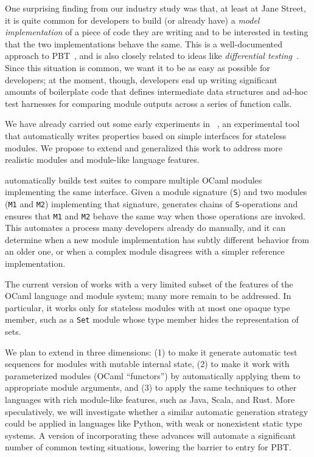 %
One surprising finding from our industry study was that, at least at
Jane Street,
it is quite common for developers to build (or already have) a {\em
model implementation} of a piece of code they are writing and to be
interested in testing that the two
implementations behave the same.  This is a well-documented approach to
PBT~\cite{hughes_experiences_2016}, and is also closely related to ideas like
{\em differential testing}~\cite{mckeeman1998differential}.
%
Since this situation is common, we want it to be as easy as possible
for developers; at the moment, though, developers end up writing
significant amounts of boilerplate code that defines intermediate data
structures and ad-hoc test harnesses for comparing module outputs across a
series of function calls.

We have already carried out some early experiments in
{\Mica}~\cite{Ng2023MicaPoster}, an experimental tool that automatically
writes properties based on simple interfaces for stateless modules.
We propose to extend and generalized this work to address more
realistic modules and module-like language features.


{\Mica} automatically builds test suites to compare multiple OCaml
modules implementing the same interface. Given a module signature
(\lstinline{S}) and two modules
(\lstinline{M1} and \lstinline{M2}) implementing that signature, {\Mica}
generates chains of \lstinline{S}-operations and ensures that
\lstinline{M1} and \lstinline{M2} behave the same way when those operations are
invoked. This automates a process many developers already do manually,
and it can
determine when a new module implementation has subtly different
behavior from an older one, or when a
complex module disagrees with a simpler reference implementation.

The current version of {\Mica} works with a very limited subset of
the features of the OCaml language and
module system; many more remain to be addressed. In particular, it
works only for stateless modules with at most one opaque type
member, such as a {\tt Set} module whose type member hides the
representation of sets.

We plan to extend {\Mica} in three dimensions: (1) to make it generate automatic
test sequences for modules with mutable internal state, (2) to
make it work with parameterized modules (OCaml ``functors'') by
automatically applying them to appropriate module arguments, and (3)
to apply the same techniques to other languages with rich module-like
features, such as Java, Scala, and Rust.  More speculatively, we will
investigate whether a similar automatic generation strategy could be
applied in languages like Python, with weak or nonexistent static type
systems.
%
A version of \Mica{} incorporating these advances will automate a
significant number of common testing situations, lowering the barrier
to entry for PBT.

